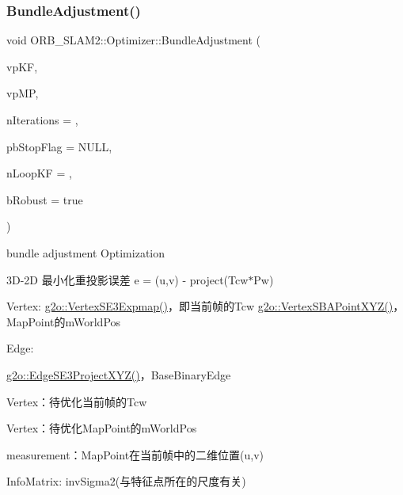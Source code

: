 \subsubsection{\texorpdfstring{Bundle\+Adjustment()}{BundleAdjustment()}}
{\footnotesize\ttfamily void O\+R\+B\+\_\+\+S\+L\+A\+M2\+::\+Optimizer\+::\+Bundle\+Adjustment (\begin{DoxyParamCaption}\item[{const std\+::vector$<$ \mbox{\hyperlink{class_o_r_b___s_l_a_m2_1_1_key_frame}{Key\+Frame}} $\ast$$>$ \&}]{vp\+KF,  }\item[{const std\+::vector$<$ \mbox{\hyperlink{class_o_r_b___s_l_a_m2_1_1_map_point}{Map\+Point}} $\ast$$>$ \&}]{vp\+MP,  }\item[{int}]{n\+Iterations = {},  }\item[{bool $\ast$}]{pb\+Stop\+Flag = {\ttfamily NULL},  }\item[{const unsigned long}]{n\+Loop\+KF = {},  }\item[{const bool}]{b\+Robust = {\ttfamily true} }\end{DoxyParamCaption})\hspace{0.3cm}{\ttfamily [static]}}



bundle adjustment Optimization 

3\+D-\/2D 最小化重投影误差 e = (u,v) -\/ project(\+Tcw$\ast$\+Pw) ~\newline

\begin{DoxyEnumerate}
\item Vertex\+: \mbox{\hyperlink{classg2o_1_1_vertex_s_e3_expmap}{g2o\+::\+Vertex\+S\+E3\+Expmap()}}，即当前帧的\+Tcw \mbox{\hyperlink{classg2o_1_1_vertex_s_b_a_point_x_y_z}{g2o\+::\+Vertex\+S\+B\+A\+Point\+X\+Y\+Z()}}，\+Map\+Point的m\+World\+Pos
\item Edge\+:
\begin{DoxyItemize}
\item \mbox{\hyperlink{classg2o_1_1_edge_s_e3_project_x_y_z}{g2o\+::\+Edge\+S\+E3\+Project\+X\+Y\+Z()}}，\+Base\+Binary\+Edge
\begin{DoxyItemize}
\item Vertex：待优化当前帧的\+Tcw
\item Vertex：待优化\+Map\+Point的m\+World\+Pos
\item measurement：\+Map\+Point在当前帧中的二维位置(u,v)
\item Info\+Matrix\+: inv\+Sigma2(与特征点所在的尺度有关)
\end{DoxyItemize}
\end{DoxyItemize}
\end{DoxyEnumerate}


